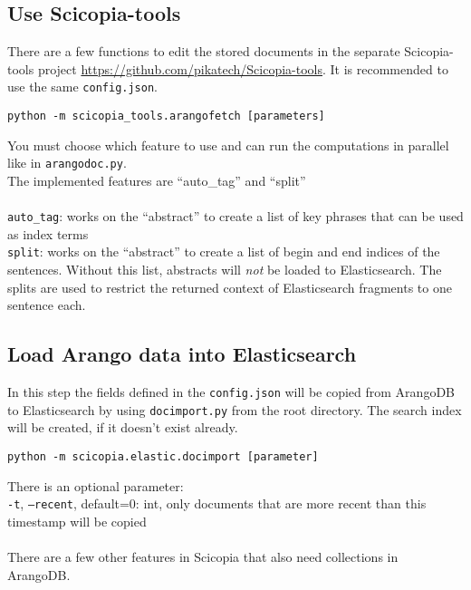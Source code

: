 \subsection{Use Scicopia-tools}
There are a few functions to edit the stored documents in the separate Scicopia-tools project \url{https://github.com/pikatech/Scicopia-tools}. It is recommended to use the same \texttt{config.json}.
\begin{verbatim}
python -m scicopia_tools.arangofetch [parameters]
\end{verbatim}
You must choose which feature to use and can run the computations in parallel like in \texttt{arangodoc.py}.\\
The implemented features are ``auto\_tag'' and ``split''\\
\\
\texttt{auto\_tag}: works on the ``abstract'' to create a list of key phrases that can be used as index terms\\
\texttt{split}: works on the ``abstract'' to create a list of begin and end indices of the sentences. Without this list, abstracts will \emph{not} be loaded to Elasticsearch. The splits are used to restrict the returned context of Elasticsearch fragments to one sentence each.

\subsection{Load Arango data into Elasticsearch}
In this step the fields defined in the \texttt{config.json} will be copied from ArangoDB to Elasticsearch by using \texttt{docimport.py} from the root directory. The search index will be created, if it doesn't exist already.
\begin{verbatim}
python -m scicopia.elastic.docimport [parameter]
\end{verbatim}
There is an optional parameter:\\
\texttt{-t}, \texttt{--recent}, default=0: int, only documents that are more recent than this timestamp will be copied\\
\\
There are a few other features in Scicopia that also need collections in ArangoDB.
